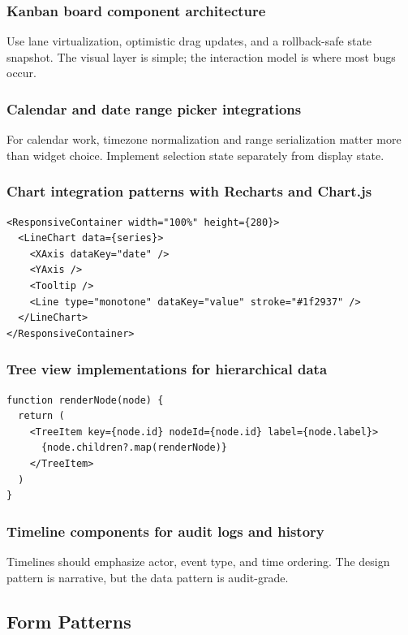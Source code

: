 \subsubsection{Kanban board component architecture}
Use lane virtualization, optimistic drag updates, and a rollback-safe state snapshot. The visual layer is simple; the interaction model is where most bugs occur.

\subsubsection{Calendar and date range picker integrations}
For calendar work, timezone normalization and range serialization matter more than widget choice. Implement selection state separately from display state.

\subsubsection{Chart integration patterns with Recharts and Chart.js}
\begin{verbatim}
<ResponsiveContainer width="100%" height={280}>
  <LineChart data={series}>
    <XAxis dataKey="date" />
    <YAxis />
    <Tooltip />
    <Line type="monotone" dataKey="value" stroke="#1f2937" />
  </LineChart>
</ResponsiveContainer>
\end{verbatim}

\subsubsection{Tree view implementations for hierarchical data}
\begin{verbatim}
function renderNode(node) {
  return (
    <TreeItem key={node.id} nodeId={node.id} label={node.label}>
      {node.children?.map(renderNode)}
    </TreeItem>
  )
}
\end{verbatim}

\subsubsection{Timeline components for audit logs and history}
Timelines should emphasize actor, event type, and time ordering. The design pattern is narrative, but the data pattern is audit-grade.

\subsection{Form Patterns}

